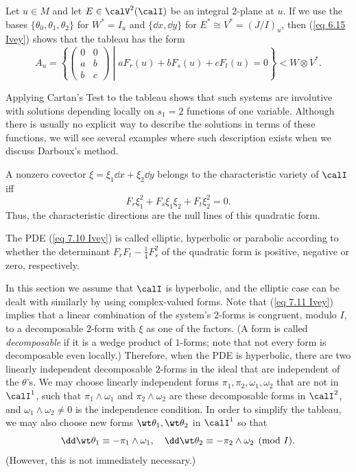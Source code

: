 Let $u\in M$ and let $E\in \calV^2(\calI)$ be an integral $2$-plane at $u$. If we use the bases $\{\theta_0,\theta_1,\theta_2\}$ for $W^\ast=I_u$ and $\{\dd x,\dd y\}$ for $E^\ast\cong V^\ast=(J\slash I)_u$, then (\ref{eq 6.15 Ivey}) shows that the tableau has the form 
\[A_u=
    \left\{
\begin{pmatrix}
    0 & 0\\
    a & b\\
    b& c
\end{pmatrix}
    \middle| aF_r(u)+bF_s(u)+cF_t(u)=0
    \right\}<W\otimes V^\ast.
\]

Applying Cartan's Test to the tableau shows that such systems are involutive with solutions depending locally on $s_1=2$ functions of one variable. Although there is usually no explicit way to describe the solutions in terms of these functions, we will see several examples where such description exists when we discuss Darboux's method.

A nonzero covector $\xi=\xi_1\dd x+\xi_2\dd y$ belongs to the characteristic variety of $\calI$ iff 
\[ F_r\xi_1^2+F_s\xi_1\xi_2+F_t\xi_2^2=0.\label{eq 7.11 Ivey}\]
Thus, the characteristic directions are the null lines of this quadratic form.

\begin{defn}
    The PDE (\ref{eq 7.10 Ivey}) is called elliptic, hyperbolic or parabolic according  to whether the determinant $F_rF_t-\frac{1}{4}F_s^2$ of the quadratic form is positive, negative or zero, respectively.
\end{defn}


In this section we assume that $\calI$ is hyperbolic, and the elliptic case can be dealt with similarly by using complex-valued forms. Note that (\ref{eq 7.11 Ivey}) implies that a linear combination of the system's $2$-forms is congruent, modulo $I$, to a decomposable $2$-form with $\xi$ as one of the factors. (A form is called \emph{decomposable} if it is a wedge product of $1$-forms; note that not every form is decomposable even locally.) Therefore, when the PDE is hyperbolic, there are two linearly independent decomposable $2$-forms in the ideal that are independent of the $\theta$'s. We may choose linearly independent forms $\pi_1,\pi_2,\omega_1,\omega_2$ that are not in $\calI^1$, such that $\pi_1\wedge\omega_1$ and $\pi_2\wedge\omega_2$ are these decomposable forms in $\calI^2$, and $\omega_1\wedge\omega_2\neq 0$ is the independence condition. In order to simplify the tableau, we may also choose new forms $\wt\theta_1,\wt\theta_2$ in $\calI^1$ so that 
\[\dd\wt\theta_1\equiv -\pi_1\wedge\omega_1,\quad \dd\wt\theta_2\equiv -\pi_2\wedge\omega_2\pmod{I}.\label{eq 7.12 Ivey}\]
(However, this is not immediately necessary.)

